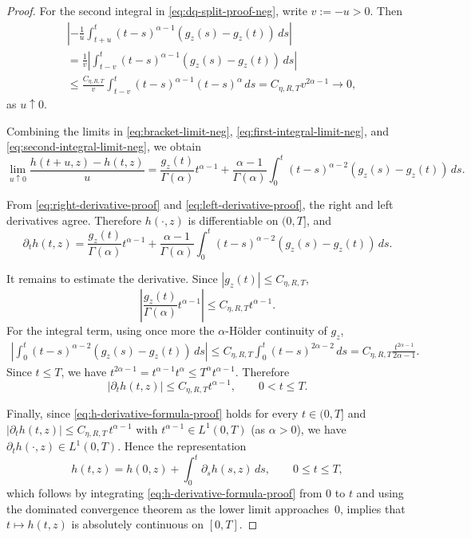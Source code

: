 \documentclass[10pt,a4paper]{amsart}
\begin{document}
\begin{proof}
For the second integral in \eqref{eq:dq-split-proof-neg}, write $v:=-u>0$. Then
\begin{align}
  &\left|
    -\frac{1}{u}\int_{t+u}^{t}(t-s)^{\alpha-1}
    \left(g_z(s)-g_z(t)\right)\,ds
  \right|
  \nonumber\\
  &=
  \frac{1}{v}\left|
    \int_{t-v}^{t}(t-s)^{\alpha-1}
    \left(g_z(s)-g_z(t)\right)\,ds
  \right|
  \nonumber\\
  &\le
  \frac{C_{\eta,R,T}}{v}
  \int_{t-v}^{t}(t-s)^{\alpha-1}(t-s)^\alpha\,ds
 =
  C_{\eta,R,T}v^{2\alpha-1}
  \to0,
\label{eq:second-integral-limit-neg}
\end{align}
as $u\uparrow0$.

Combining the limits in \eqref{eq:bracket-limit-neg}, \eqref{eq:first-integral-limit-neg}, and \eqref{eq:second-integral-limit-neg},
we obtain
\begin{equation}
  \lim_{u\uparrow0}\frac{h(t+u,z)-h(t,z)}{u}
  =
  \frac{g_z(t)}{\Gamma(\alpha)}t^{\alpha-1}
  +
  \frac{\alpha-1}{\Gamma(\alpha)}
  \int_0^t (t-s)^{\alpha-2}\left(g_z(s)-g_z(t)\right)\,ds .
  \label{eq:left-derivative-proof}
\end{equation}

From \eqref{eq:right-derivative-proof} and \eqref{eq:left-derivative-proof}, the right and left derivatives agree. Therefore $h(\cdot,z)$ is differentiable on $(0,T]$, and
\begin{equation}\label{eq:h-derivative-formula-proof}
  \partial_t h(t,z)
  =
  \frac{g_z(t)}{\Gamma(\alpha)}t^{\alpha-1}
  +
  \frac{\alpha-1}{\Gamma(\alpha)}
  \int_0^t (t-s)^{\alpha-2}\left(g_z(s)-g_z(t)\right)\,ds .
\end{equation}

It remains to estimate the derivative. Since $|g_z(t)|\le C_{\eta,R,T}$,
\[
  \left|\frac{g_z(t)}{\Gamma(\alpha)}t^{\alpha-1}\right|
  \le C_{\eta,R,T}t^{\alpha-1}.
\]
For the integral term, using once more the $\alpha$-H\"older continuity of $g_z$,
\begin{align*}
  \left|
    \int_0^t (t-s)^{\alpha-2}\left(g_z(s)-g_z(t)\right)\,ds
  \right|
  \le
  C_{\eta,R,T}\int_0^t (t-s)^{2\alpha-2}\,ds
 =
  C_{\eta,R,T}\frac{t^{2\alpha-1}}{2\alpha-1}.
\end{align*}
Since $t\le T$, we have $t^{2\alpha-1}=t^{\alpha-1}t^\alpha\le T^\alpha t^{\alpha-1}$.
Therefore
\[
  |\partial_t h(t,z)|
  \le C_{\eta,R,T}t^{\alpha-1},
  \qquad 0<t\le T.
\]

Finally, since \eqref{eq:h-derivative-formula-proof} holds for every $t\in(0,T]$
and $|\partial_t h(t,z)|\le C_{\eta,R,T}\,t^{\alpha-1}$ with $t^{\alpha-1}\in L^1(0,T)$ (as $\alpha>0$), we have $\partial_t h(\cdot,z)\in L^1(0,T)$. Hence the representation
\[
  h(t,z)=h(0,z)+\int_0^t \partial_s h(s,z)\,ds,\qquad 0\le t\le T,
\]
which follows by integrating \eqref{eq:h-derivative-formula-proof} from $0$ to $t$ and using the dominated convergence theorem as the lower limit approaches~$0$, implies that $t\mapsto h(t,z)$ is absolutely continuous on $[0,T]$.
\end{proof}
\end{document}
